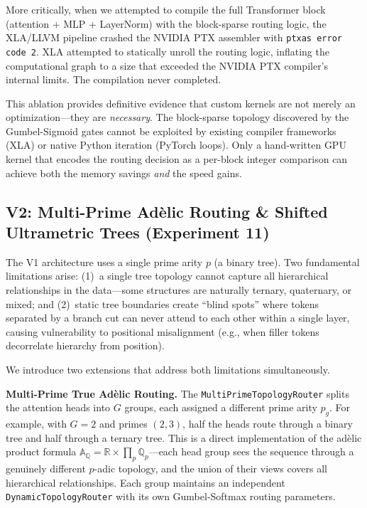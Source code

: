 \documentclass[11pt,a4paper]{article}
\begin{document}
More critically, when we attempted to compile the full Transformer block (attention + MLP + LayerNorm) with the block-sparse routing logic, the XLA/LLVM pipeline crashed the NVIDIA PTX assembler with \texttt{ptxas error code 2}. XLA attempted to statically unroll the routing logic, inflating the computational graph to a size that exceeded the NVIDIA PTX compiler's internal limits. The compilation never completed.

This ablation provides definitive evidence that custom kernels are not merely an optimization---they are \emph{necessary}. The block-sparse topology discovered by the Gumbel-Sigmoid gates cannot be exploited by existing compiler frameworks (XLA) or native Python iteration (PyTorch loops). Only a hand-written GPU kernel that encodes the routing decision as a per-block integer comparison can achieve both the memory savings \emph{and} the speed gains.

\subsection{V2: Multi-Prime Ad\`elic Routing \& Shifted Ultrametric Trees (Experiment 11)}
\label{sec:v2}

The V1 architecture uses a single prime arity $p$ (a binary tree). Two fundamental limitations arise: (1)~a single tree topology cannot capture all hierarchical relationships in the data---some structures are naturally ternary, quaternary, or mixed; and (2)~static tree boundaries create ``blind spots'' where tokens separated by a branch cut can never attend to each other within a single layer, causing vulnerability to positional misalignment (e.g., when filler tokens decorrelate hierarchy from position).

We introduce two extensions that address both limitations simultaneously.

\textbf{Multi-Prime True Ad\`elic Routing.} The \texttt{MultiPrimeTopologyRouter} splits the attention heads into $G$ groups, each assigned a different prime arity $p_g$. For example, with $G=2$ and primes $(2, 3)$, half the heads route through a binary tree and half through a ternary tree. This is a direct implementation of the ad\`elic product formula $\mathbb{A}_\mathbb{Q} = \mathbb{R} \times \prod_p \mathbb{Q}_p$---each head group sees the sequence through a genuinely different $p$-adic topology, and the union of their views covers all hierarchical relationships. Each group maintains an independent \texttt{DynamicTopologyRouter} with its own Gumbel-Softmax routing parameters.
\end{document}

